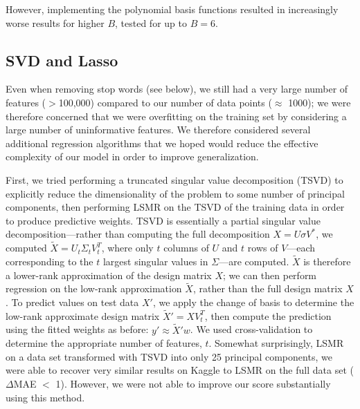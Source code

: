 \documentclass[11pt]{amsart}
\begin{document}
However, implementing the polynomial basis functions resulted in increasingly worse results for higher $B$, tested for up to $B=6$.

\subsection{SVD and Lasso}

Even when removing stop words (see below), we still had a very large number of features ($>$100,000) compared to our number of data points ($\approx$ 1000); we were therefore concerned that we were overfitting on the training set by considering a large number of uninformative features.  We therefore considered several additional regression algorithms that we hoped would reduce the effective complexity of our model in order to improve generalization. 

First, we tried performing a truncated singular value decomposition (TSVD) to explicitly reduce the dimensionality of the problem to some number of principal components, then performing LSMR on the TSVD of the training data in order to produce predictive weights. TSVD is essentially a partial singular value decomposition---rather than computing the full decomposition $X = U \sigma V^*$, we computed $\tilde{X} = U_t \Sigma_t V_t^T$, where only $t$ columns of $U$ and $t$ rows of $V$---each corresponding to the $t$ largest singular values in $\Sigma$---are computed. $\tilde{X}$ is therefore a lower-rank approximation of the design matrix $X$; we can then perform regression on the low-rank approximation $\tilde{X}$, rather than the full design matrix $X$. To predict values on test data $X'$, we apply the change of basis to determine the low-rank approximate design matrix $\tilde{X}' = XV_t^T$, then compute the prediction using the fitted weights as before: $y' \approx \tilde{X}' w$. We used cross-validation to determine the appropriate number of features, $t$. Somewhat surprisingly, LSMR on a data set transformed with TSVD into only 25 principal components, we were able to recover very similar results on Kaggle to LSMR on the full data set ($\Delta$MAE $<$ 1). However, we were not able to improve our score substantially using this method.
\end{document}
